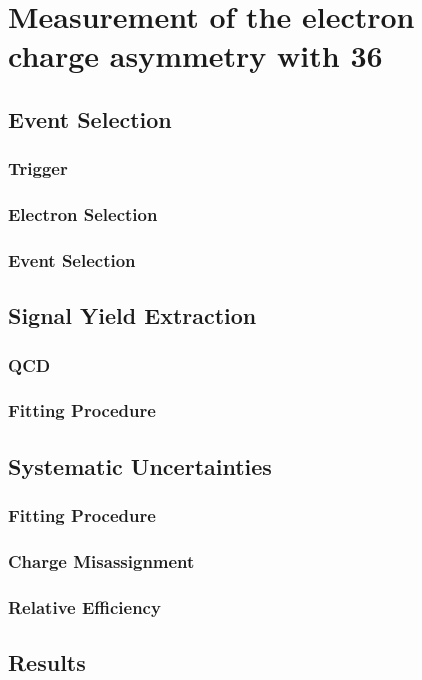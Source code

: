 \chapter{ 
Measurement of the electron charge asymmetry with \unit{36}{\invpb} }

\section{Event Selection}
\subsection{Trigger}
\subsection{Electron Selection}
\subsection{Event Selection}

\section{Signal Yield Extraction}
\subsection{QCD \met}

\subsection{Fitting Procedure}

\section{Systematic Uncertainties}

\subsection{Fitting Procedure}

\subsection{Charge Misassignment}

\subsection{Relative Efficiency}

\section{Results}
